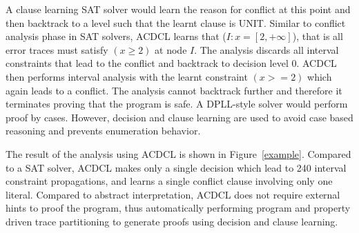 A clause learning SAT solver would learn the reason for conflict at this 
point and then backtrack to a level such that the learnt clause is UNIT.  
Similar to conflict analysis phase in SAT solvers, ACDCL learns that 
(\(I: x = [2,+\infty]\)), that is all error traces must satisfy $(x \geq 2)$ 
at node $I$.  The analysis discards all interval constraints that
lead to the conflict and backtrack to decision level 0.  ACDCL then 
performs interval analysis with the learnt constraint $(x>=2)$ which again 
leads to a conflict.  The analysis cannot backtrack further and therefore 
it terminates proving that the program is safe.  A DPLL-style solver would 
perform proof by cases.  However, decision and clause learning are used 
to avoid case based reasoning and prevents enumeration behavior.     
   
The result of the analysis using ACDCL is shown in Figure~\ref{example}.  
Compared to a SAT solver, ACDCL makes only a single decision which lead 
to 240 interval constraint propagations, and learns a single conflict clause 
involving only one literal.  Compared to abstract interpretation, ACDCL does 
not require external hints to proof the program, thus automatically performing 
program and property driven trace partitioning to generate proofs using decision 
and clause learning.  
